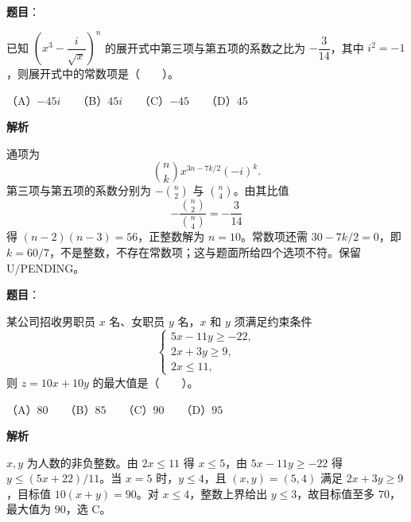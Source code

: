 \begin{answer}

\textbf{题目}：

已知 $\left(x^3-\dfrac{i}{\sqrt{x}}\right)^n$ 的展开式中第三项与第五项的系数之比为 $-\dfrac3{14}$，其中 $i^2=-1$，则展开式中的常数项是\mbox{（　　）}。

（A）$-45i$　　（B）$45i$　　（C）$-45$　　（D）$45$

\textbf{解析}

通项为
\nopagebreak[4]
\[
\binom nk x^{3n-7k/2}(-i)^k.
\]
第三项与第五项的系数分别为 $-\binom n2$ 与 $\binom n4$。由其比值
\nopagebreak[4]
\[
-\frac{\binom n2}{\binom n4}=-\frac3{14}
\]
得 $(n-2)(n-3)=56$，正整数解为 $n=10$。常数项还需 $30-7k/2=0$，即 $k=60/7$，不是整数，不存在常数项；这与题面所给四个选项不符。保留 U/PENDING。


\end{answer}
\begin{answer}

\textbf{题目}：

某公司招收男职员 $x$ 名、女职员 $y$ 名，$x$ 和 $y$ 须满足约束条件
\nopagebreak[4]
\[
\begin{cases}
5x-11y\ge -22,\\
2x+3y\ge 9,\\
2x\le 11,
\end{cases}
\]
则 $z=10x+10y$ 的最大值是\mbox{（　　）}。

（A）$80$　　（B）$85$　　（C）$90$　　（D）$95$

\textbf{解析}

$x,y$ 为人数的非负整数。由 $2x\le11$ 得 $x\le5$，由 $5x-11y\ge-22$ 得 $y\le(5x+22)/11$。当 $x=5$ 时，$y\le4$，且 $(x,y)=(5,4)$ 满足 $2x+3y\ge9$，目标值 $10(x+y)=90$。对 $x\le4$，整数上界给出 $y\le3$，故目标值至多 $70$，最大值为 $90$，选 C。


\end{answer}
